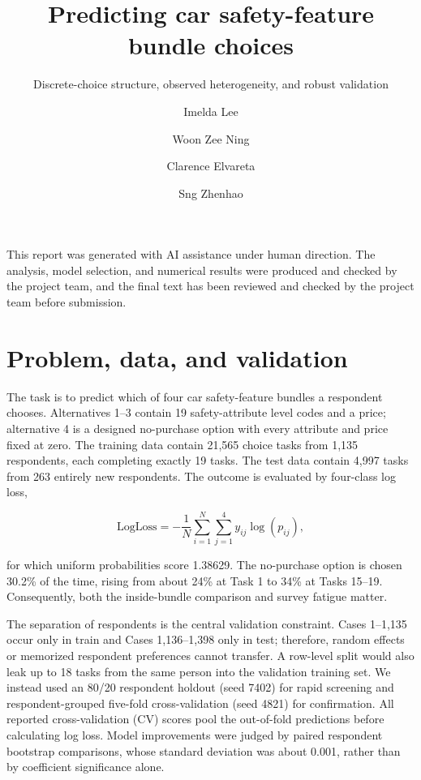 \documentclass[
  9.5pt,
]{article}
\title{Predicting car safety-feature bundle choices}
\subtitle{Discrete-choice structure, observed heterogeneity, and robust
validation}
\author{Imelda Lee \and Woon Zee Ning \and Clarence Elvareta \and Sng
Zhenhao}
\date{}
\begin{document}
\maketitle


\begin{tcolorbox}[enhanced jigsaw, arc=.35mm, bottomrule=.15mm, bottomtitle=1mm, breakable, colback=white, colbacktitle=quarto-callout-note-color!10!white, colframe=quarto-callout-note-color-frame, coltitle=black, left=2mm, leftrule=.75mm, opacityback=0, opacitybacktitle=0.6, rightrule=.15mm, title=\textcolor{quarto-callout-note-color}{\faInfo}\hspace{0.5em}{Note}, titlerule=0mm, toprule=.15mm, toptitle=1mm]

This report was generated with AI assistance under human direction. The
analysis, model selection, and numerical results were produced and
checked by the project team, and the final text has been reviewed and
checked by the project team before submission.

\end{tcolorbox}

\section{Problem, data, and
validation}\label{problem-data-and-validation}

The task is to predict which of four car safety-feature bundles a
respondent chooses. Alternatives 1--3 contain 19 safety-attribute level
codes and a price; alternative 4 is a designed no-purchase option with
every attribute and price fixed at zero. The training data contain
21,565 choice tasks from 1,135 respondents, each completing exactly 19
tasks. The test data contain 4,997 tasks from 263 entirely new
respondents. The outcome is evaluated by four-class log loss,

\[
\mathrm{LogLoss}=-\frac{1}{N}\sum_{i=1}^{N}\sum_{j=1}^{4}
y_{ij}\log(p_{ij}),
\]

for which uniform probabilities score 1.38629. The no-purchase option is
chosen 30.2\% of the time, rising from about 24\% at Task 1 to 34\% at
Tasks 15--19. Consequently, both the inside-bundle comparison and survey
fatigue matter.

The separation of respondents is the central validation constraint.
Cases 1--1,135 occur only in train and Cases 1,136--1,398 only in test;
therefore, random effects or memorized respondent preferences cannot
transfer. A row-level split would also leak up to 18 tasks from the same
person into the validation training set. We instead used an 80/20
respondent holdout (seed 7402) for rapid screening and
respondent-grouped five-fold cross-validation (seed 4821) for
confirmation. All reported cross-validation (CV) scores pool the
out-of-fold predictions before calculating log loss. Model improvements
were judged by paired respondent bootstrap comparisons, whose standard
deviation was about 0.001, rather than by coefficient significance
alone.
\end{document}
